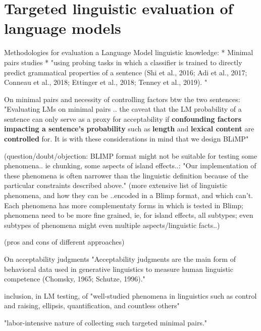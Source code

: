 \section{Targeted linguistic evaluation of language models}

Methodologies for evaluation a Language Model linguistic knowledge:
* Minimal pairs studies \citep{warstadt2020blimp, linzen2016assessing, marvin2018targeted, wilcox2018rnn}
* "using probing tasks in which a classifier is trained to directly predict grammatical properties of a sentence  (Shi et al., 2016; Adi et al.,
2017; Conneau et al., 2018; Ettinger et al., 2018;
Tenney et al., 2019). "  \citep{warstadt2020blimp}	

On minimal pairs and necessity of controlling factors btw the two sentences:
"Evaluating LMs on minimal pairs .. the caveat that the LM probability of a sentence can only serve as a proxy for acceptability if \textbf{confounding factors impacting a sentence’s probability} such as \textbf{length} and \textbf{lexical content} are \textbf{controlled} for. It is with these considerations in mind that we design BLiMP"

(question/doubt/objection: BLIMP format might not be suitable for testing some phenomena.. ie chunking, some aspects of island effects..: "Our implementation of these phenomena is often
narrower than the linguistic definition because of the particular constraints described above."  \citep{warstadt2020blimp}	
(more extensive list of linguistic phenomena, and how they can be ..encoded in a Blimp format, and which can't. Each phenomena has more complementaty forms in which is tested in Blimp; phenomena need to be more fine grained, ie, for island effects, all subtypes; even subtypes of phenomena might even multiple aspects/linguistic facts..)

(pros and cons of different approaches)


On acceptability judgments
"Acceptability judgments are the main form of
behavioral data used in generative linguistics to
measure human linguistic competence (Chomsky,
1965; Schutze, 1996)." \citep{warstadt2020blimp}	

inclusion, in LM testing, of "well-studied phenomena in linguistics such as control and
raising, ellipsis, quantification, and countless others"  \citep{warstadt2020blimp}	

"labor-intensive nature of collecting such targeted minimal pairs." \citep{warstadt2020blimp}	


